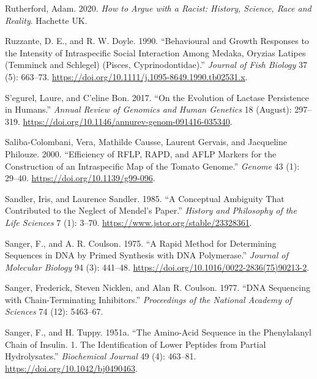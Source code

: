 \documentclass[
]{book}
\newlength{\cslhangindent}
\newlength{\cslentryspacingunit} %
\newenvironment{CSLReferences}[2] %
 {%
  \setlength{\parindent}{0pt}
  \ifodd #1
  \let\oldpar\par
  \def\par{\hangindent=\cslhangindent\oldpar}
  \fi
  \setlength{\parskip}{#2\cslentryspacingunit}
 }%
 {}
\begin{document}
\begin{CSLReferences}{1}{0}
\leavevmode{}%
Rutherford, Adam. 2020. \emph{How to Argue with a Racist: {History}, Science, Race and Reality}. {Hachette UK}.

\leavevmode{}%
Ruzzante, D. E., and R. W. Doyle. 1990. {``Behavioural and Growth Responses to the Intensity of Intraspecific Social Interaction Among Medaka, {Oryzias} Latipes ({Temminck} and {Schlegel}) ({Pisces}, {Cyprinodontidae}).''} \emph{Journal of Fish Biology} 37 (5): 663--73. \url{https://doi.org/10.1111/j.1095-8649.1990.tb02531.x}.

\leavevmode{}%
S'egurel, Laure, and C'eline Bon. 2017. {``On the {Evolution} of {Lactase Persistence} in {Humans}.''} \emph{Annual Review of Genomics and Human Genetics} 18 (August): 297--319. \url{https://doi.org/10.1146/annurev-genom-091416-035340}.

\leavevmode{}%
Saliba-Colombani, Vera, Mathilde Causse, Laurent Gervais, and Jacqueline Philouze. 2000. {``Efficiency of {RFLP}, {RAPD}, and {AFLP} Markers for the Construction of an Intraspecific Map of the Tomato Genome.''} \emph{Genome} 43 (1): 29--40. \url{https://doi.org/10.1139/g99-096}.

\leavevmode{}%
Sandler, Iris, and Laurence Sandler. 1985. {``A {Conceptual Ambiguity} That {Contributed} to the {Neglect} of {Mendel}'s {Paper}.''} \emph{History and Philosophy of the Life Sciences} 7 (1): 3--70. \url{https://www.jstor.org/stable/23328361}.

\leavevmode{}%
Sanger, F., and A. R. Coulson. 1975. {``A Rapid Method for Determining Sequences in {DNA} by Primed Synthesis with {DNA} Polymerase.''} \emph{Journal of Molecular Biology} 94 (3): 441--48. \url{https://doi.org/10.1016/0022-2836(75)90213-2}.

\leavevmode{}%
Sanger, Frederick, Steven Nicklen, and Alan R. Coulson. 1977. {``{DNA} Sequencing with Chain-Terminating Inhibitors.''} \emph{Proceedings of the National Academy of Sciences} 74 (12): 5463--67.

\leavevmode{}%
Sanger, F., and H. Tuppy. 1951a. {``The Amino-Acid Sequence in the Phenylalanyl Chain of Insulin. 1. {The} Identification of Lower Peptides from Partial Hydrolysates.''} \emph{Biochemical Journal} 49 (4): 463--81. \url{https://doi.org/10.1042/bj0490463}.


\end{CSLReferences}
\end{document}
